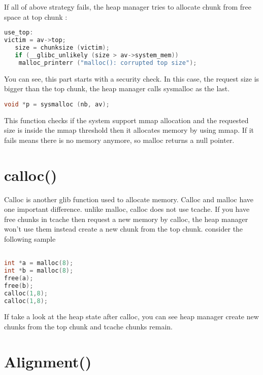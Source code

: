 \documentclass{masterthesis}
\newcommand*\tch{tcache}
\begin{document}
If all of above strategy fails, the heap manager tries to allocate chunk from free space at top chunk :
\begin{lstlisting}[language=c,frame=tlrb]
use_top:
victim = av->top;
   size = chunksize (victim);
   if (__glibc_unlikely (size > av->system_mem))
    malloc_printerr ("malloc(): corrupted top size");
\end{lstlisting}
You can see, this part starts with a security check. In this case, the request size is bigger than the top chunk, the heap manager calls sysmalloc as the last.
\begin{lstlisting}[language=c,frame=tlrb]
 void *p = sysmalloc (nb, av);
 \end{lstlisting}
This function checks if the system support mmap allocation and the requested size is inside the mmap threshold then it allocates memory by using mmap. If it fails means there is no memory anymore, so malloc returns a null pointer.
\section{calloc()}
Calloc is another glib function used to allocate memory. Calloc and malloc have one important difference. unlike malloc, calloc does not use \tch{}. If you have free chunks in \tch{} then request a new memory by calloc, the heap manager won't use them instead create a new chunk from the top chunk. consider the following sample 
\begin{lstlisting}[language=c,frame=tlrb]

int *a = malloc(8);
int *b = malloc(8);
free(a);
free(b);
calloc(1,8);
calloc(1,8);
\end{lstlisting}
If take a look at the heap state after calloc, you can see heap manager create new chunks from the top chunk and tcache chunks remain.

\section{Alignment()}
\end{document}
